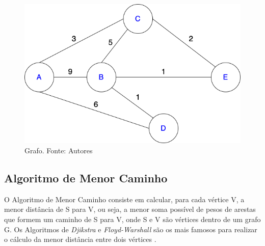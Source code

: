 \begin{figure}[H]
    \begin{center}
        \includegraphics[scale=0.45]{figuras/referencial_teorico/Grafo.drawio.png}
        \caption{{Grafo. Fonte: Autores}}
        \label{grafo_1}
    \end{center}
\end{figure}

\subsection{Algoritmo de Menor Caminho}
O Algoritmo de Menor Caminho consiste em calcular, para cada vértice V, a menor distância de S para V, ou seja, a menor soma possível de pesos de arestas que formem um caminho de S para V, onde S e V são vértices dentro de um grafo G. Os Algoritmos de \textit{Djikstra} e \textit{Floyd-Warshall} são os mais famosos para realizar o cálculo da menor distância entre dois vértices \cite{even2011graph}.
